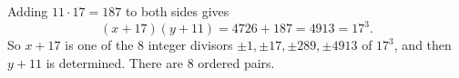 Adding $11\cdot17=187$ to both sides gives
\[(x+17)(y+11)=4726+187=4913=17^3.\]
So $x+17$ is one of the $8$ integer divisors $\pm1,\pm17,\pm289,\pm4913$ of $17^3$, and then $y+11$ is determined. There are $\boxed{8}$ ordered pairs.
